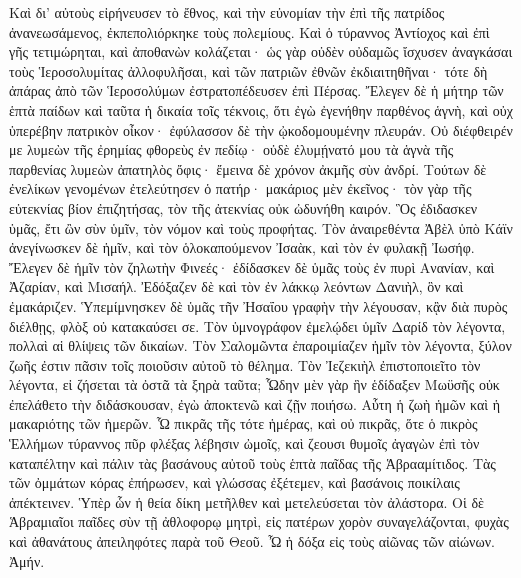 Καὶ δι' αὐτοὺς εἰρήνευσεν τὸ ἔθνος, καὶ τὴν εὐνομίαν τὴν ἐπὶ τῆς πατρίδος ἀνανεωσάμενος, ἐκπεπολιόρκηκε τοὺς πολεμίους. 
Καὶ ὁ τύραννος Ἀντίοχος καὶ ἐπὶ γῆς τετιμώρηται, καὶ ἀποθανὼν κολάζεται· ὡς γὰρ οὐδὲν οὐδαμῶς ἴσχυσεν ἀναγκάσαι τοὺς Ἱεροσολυμίτας ἀλλοφυλῆσαι, καὶ τῶν πατριῶν ἐθνῶν ἐκδιαιτηθῆναι· 
τότε δὴ ἀπάρας ἀπὸ τῶν Ἱεροσολύμων ἐστρατοπέδευσεν ἐπὶ Πέρσας. 
Ἔλεγεν δὲ ἡ μήτηρ τῶν ἑπτὰ παίδων καὶ ταῦτα ἡ δικαία τοῖς τέκνοις, ὅτι ἐγὼ ἐγενήθην παρθένος ἁγνὴ, καὶ οὐχ ὑπερέβην πατρικὸν οἶκον· ἐφύλασσον δὲ τὴν ᾠκοδομουμένην πλευράν. 
Οὐ διέφθειρέν με λυμεὼν τῆς ἐρημίας φθορεὺς ἐν πεδίῳ· οὐδὲ ἐλυμῄνατό μου τὰ ἁγνὰ τῆς παρθενίας λυμεὼν ἀπατηλὸς ὄφις· ἔμεινα δὲ χρόνον ἀκμῆς σὺν ἀνδρί. 
Τούτων δὲ ἐνελίκων γενομένων ἐτελεύτησεν ὁ πατήρ· μακάριος μὲν ἐκεῖνος· τὸν γὰρ τῆς εὐτεκνίας βίον ἐπιζητήσας, τὸν τῆς ἀτεκνίας οὐκ ὠδυνήθη καιρόν. 
Ὃς ἐδιδασκεν ὑμᾶς, ἔτι ὢν σὺν ὑμῖν, τὸν νόμον καὶ τοὺς προφήτας. 
Τὸν ἀναιρεθέντα Ἀβὲλ ὑπὸ Κάϊν ἀνεγίνωσκεν δὲ ἡμῖν, καὶ τὸν ὁλοκαπούμενον Ἰσαὰκ, καὶ τὸν ἐν φυλακῇ Ἰωσήφ. 
Ἔλεγεν δὲ ἡμῖν τὸν ζηλωτὴν Φινεές· ἐδίδασκεν δὲ ὑμᾶς τοὺς ἐν πυρὶ Ανανίαν, καὶ Ἀζαρίαν, καὶ Μισαήλ. 
Ἐδόξαζεν δὲ καὶ τὸν ἐν λάκκῳ λεόντων Δανιὴλ, ὃν καὶ ἐμακάριζεν. 
Ὑπεμίμνησκεν δὲ ὑμᾶς τῆν Ἠσαΐου γραφὴν τὴν λέγουσαν, κᾂν διὰ πυρὸς διέλθῃς, φλὸξ οὐ κατακαύσει σε. 
Τὸν ὑμνογράφον ἐμελῴδει ὑμῖν Δαρίδ τὸν λέγοντα, πολλαὶ αἱ θλίψεις τῶν δικαίων. 
Τὸν Σαλομῶντα ἐπαροιμίαζεν ἡμῖν τὸν λέγοντα, ξύλον ζωῆς ἐστιν πᾶσιν τοῖς ποιοῦσιν αὐτοῦ τὸ θέλημα. 
Τὸν Ἰεζεκιὴλ ἐπιστοποιεῖτο τὸν λέγοντα, εἰ ζήσεται τὰ ὀστᾶ τὰ ξηρὰ ταῦτα; 
Ὧδην μὲν γὰρ ἣν ἑδίδαξεν Μωϋσῆς οὐκ ἐπελάθετο τὴν διδάσκουσαν, ἐγὼ ἀποκτενῶ καὶ ζῇν ποιήσω. 
Αὗτη ἡ ζωὴ ἡμῶν καὶ ἡ μακαριότης τῶν ἡμερῶν. 
Ὧ πικρᾶς τῆς τότε ἡμέρας, καὶ οὐ πικρᾶς, ὅτε ὁ πικρὸς Ἑλλήμων τύραννος πῦρ φλέξας λέβησιν ὠμοῖς, καὶ ζεουσι θυμοῖς ἀγαγὼν ἐπὶ τὸν καταπέλτην καὶ πάλιν τὰς βασάνους αὐτοῦ τοὺς ἑπτὰ παῖδας τῆς Ἁβρααμίτιδος. 
Τὰς τῶν ὀμμάτων κόρας ἐπήρωσεν, καὶ γλώσσας ἐξέτεμεν, καὶ βασάνοις ποικίλαις ἀπέκτεινεν. 
Ὑπὲρ ὧν ἡ θεία δίκη μετῆλθεν καὶ μετελεύσεται τὸν ἀλάστορα. 
Οἱ δὲ Ἁβραμιαῖοι παῖδες σὺν τῇ ἀθλοφορῳ μητρὶ, εἰς πατέρων χορὸν συναγελάζονται, φυχὰς καὶ ἀθανάτους ἀπειληφότες παρὰ τοῦ Θεοῦ. 
Ὦ ἡ δόξα εἰς τοὺς αἰῶνας τῶν αἰώνων. Ἀμήν. 
